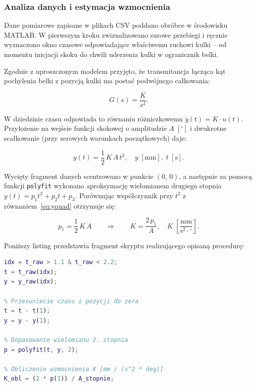 \subsubsection{Analiza danych i estymacja wzmocnienia}
 
Dane pomiarowe zapisane w plikach CSV poddano obróbce w środowisku MATLAB.
W pierwszym kroku zwizualizowano surowe przebiegi i ręcznie wyznaczono okno
czasowe odpowiadające właściwemu ruchowi kulki -- od momentu inicjacji skoku do
chwili uderzenia kulki w ogranicznik belki.
 
Zgodnie z uproszczonym modelem przyjęto, że
transmitancja łącząca kąt pochylenia belki z pozycją kulki ma postać podwójnego
całkowania:
 
\begin{equation}
    G(s) = \frac{K}{s^2}.
    \label{eq:Gident}
\end{equation}
 
W dziedzinie czasu odpowiada to równaniu różniczkowemu $\ddot{y}(t) = K \cdot u(t)$.
Przyłożenie na wejście funkcji skokowej o amplitudzie $A\;[{^\circ}]$ i dwukrotne
scałkowanie (przy zerowych warunkach początkowych) daje:
 
\begin{equation}
    y(t) = \frac{1}{2}\,K\,A\,t^2, \quad y\;[\mathrm{mm}],\; t\;[\mathrm{s}].
    \label{eq:yquad}
\end{equation}
 
Wycięty fragment danych scentrowano w punkcie $(0,\,0)$, a następnie za pomocą
funkcji \texttt{polyfit} wykonano aproksymację wielomianem drugiego stopnia
$y(t) = p_1 t^2 + p_2 t + p_3$.
Porównując współczynnik przy $t^2$ z równaniem~\eqref{eq:yquad} otrzymuje się:
 
\begin{equation}
    p_1 = \frac{1}{2}\,K\,A
    \qquad\Longrightarrow\qquad
    K = \frac{2\,p_1}{A}, \quad K\;\left[\frac{\mathrm{mm}}{\mathrm{s}^2 \cdot {^\circ}}\right].
    \label{eq:Kest}
\end{equation}
 
Poniższy listing przedstawia fragment skryptu realizującego opisaną procedurę:
 
\begin{lstlisting}[language=Matlab, frame=single,
    caption={Fragment skryptu MATLAB estymującego wzmocnienie $K$},
    label={lst:matlab_ident}]
% Ograniczenie danych do wlasciwego ruchu pilki
idx = t_raw > 1.1 & t_raw < 2.2;
t = t_raw(idx);
y = y_raw(idx);
 
% Przesuniecie czasu i pozycji do zera
t = t - t(1);
y = y - y(1);
 
% Dopasowanie wielomianu 2. stopnia
p = polyfit(t, y, 2);
 
% Obliczenie wzmocnienia K [mm / (s^2 * deg)]
K_obl = (2 * p(1)) / A_stopnie;
\end{lstlisting}
 

